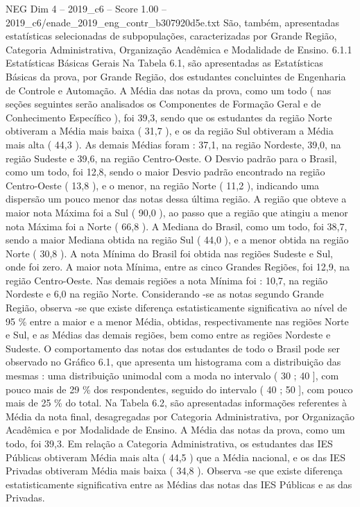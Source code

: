 \begin{textsample}{NEG Dim 4 – 2019\_c6 – Score 1.00 – 2019\_c6/enade\_2019\_eng\_contr\_b307920d5e.txt}
São, também, apresentadas estatísticas selecionadas de subpopulações, caracterizadas por Grande Região, Categoria Administrativa, Organização Acadêmica e Modalidade de Ensino. 6.1.1 Estatísticas Básicas Gerais Na Tabela 6.1, são apresentadas as Estatísticas Básicas da prova, por Grande Região, dos estudantes concluintes de Engenharia de Controle e Automação.
A Média das notas da prova, como um todo ( nas seções seguintes serão analisados os Componentes de Formação Geral e de Conhecimento Específico ), foi 39,3, sendo que os estudantes da região Norte obtiveram a Média mais baixa ( 31,7 ), e os da região Sul obtiveram a Média mais alta ( 44,3 ).
As demais Médias foram : 37,1, na região Nordeste, 39,0, na região Sudeste e 39,6, na região Centro-Oeste.
O Desvio padrão para o Brasil, como um todo, foi 12,8, sendo o maior Desvio padrão encontrado na região Centro-Oeste ( 13,8 ), e o menor, na região Norte ( 11,2 ), indicando uma dispersão um pouco menor das notas dessa última região.
A região que obteve a maior nota Máxima foi a Sul ( 90,0 ), ao passo que a região que atingiu a menor nota Máxima foi a Norte ( 66,8 ).
A Mediana do Brasil, como um todo, foi 38,7, sendo a maior Mediana obtida na região Sul ( 44,0 ), e a menor obtida na região Norte ( 30,8 ).
A nota Mínima do Brasil foi obtida nas regiões Sudeste e Sul, onde foi zero.
A maior nota Mínima, entre as cinco Grandes Regiões, foi 12,9, na região Centro-Oeste.
Nas demais regiões a nota Mínima foi : 10,7, na região Nordeste e 6,0 na região Norte.
Considerando -se as notas segundo Grande Região, observa -se que existe diferença estatisticamente significativa ao nível de 95 \% entre a maior e a menor Média, obtidas, respectivamente nas regiões Norte e Sul, e as Médias das demais regiões, bem como entre as regiões Nordeste e Sudeste.
O comportamento das notas dos estudantes de todo o Brasil pode ser observado no Gráfico 6.1, que apresenta um histograma com a distribuição das mesmas : uma distribuição unimodal com a moda no intervalo ( 30 ; 40 ], com pouco mais de 29 \% dos respondentes, seguido do intervalo ( 40 ; 50 ], com pouco mais de 25 \% do total.
Na Tabela 6.2, são apresentadas informações referentes à Média da nota final, desagregadas por Categoria Administrativa, por Organização Acadêmica e por Modalidade de Ensino.
A Média das notas da prova, como um todo, foi 39,3.
Em relação a Categoria Administrativa, os estudantes das IES Públicas obtiveram Média mais alta ( 44,5 ) que a Média nacional, e os das IES Privadas obtiveram Média mais baixa ( 34,8 ).
Observa -se que existe diferença estatisticamente significativa entre as Médias das notas das IES Públicas e as das Privadas.

\end{textsample}

